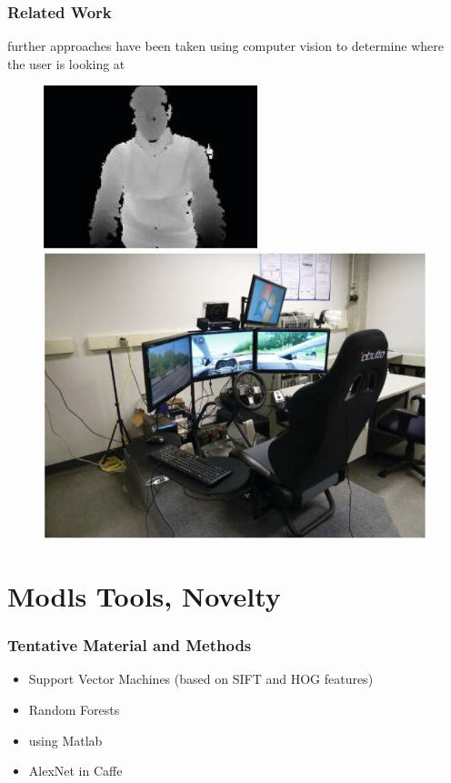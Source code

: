 \documentclass{beamer}
\begin{document}
	
	\begin{frame}
		\frametitle{Related Work}
		further approaches have been taken using computer vision to determine where the user is looking at 
		
		
		\begin{figure}
			\includegraphics{RanFor}
			\includegraphics[scale = .365]{RanForSim}
		\end{figure}
		\begin{figure}
			
			
			
		\end{figure}
	\end{frame}
	
	\section{Modls Tools, Novelty}	

    \begin{frame}
        \frametitle{Tentative Material and Methods}
        \begin{itemize}
            \item Support Vector Machines (based on SIFT and HOG features)
            \item Random Forests
            \item using Matlab
            \item AlexNet in Caffe
        \end{itemize}

    \end{frame}
\end{document}
